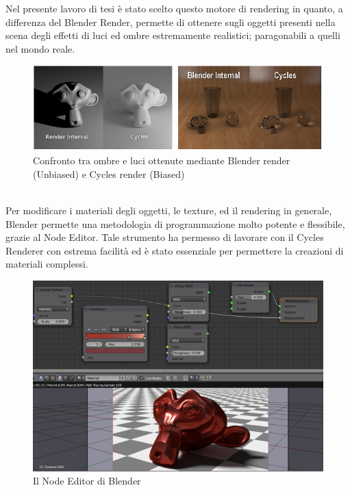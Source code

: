 Nel presente lavoro di tesi è stato scelto questo motore di rendering in quanto, a differenza del Blender Render, permette di ottenere sugli oggetti presenti nella scena degli effetti di luci ed ombre estremamente realistici; paragonabili a quelli nel mondo reale.
\begin{figure}[htb]
 \centering
 \includegraphics[width=0.9\linewidth]{images/chapter_tecnologie_abilitanti/tecnologie_abilitanti_bias_unbias.png}\hfill
 \caption[Cycles render e Blender render]{Confronto tra ombre e luci ottenute mediante Blender render (Unbiased) e Cycles render (Biased)}
 \label{fig:tecnologie_abilitanti_bias_unbias}
\end{figure}
\\
Per modificare i materiali degli oggetti, le texture, ed il rendering in generale, Blender permette una metodologia di programmazione molto potente e flessibile, grazie al Node Editor. Tale strumento ha permesso di lavorare con il Cycles Renderer con estrema facilità ed è stato essenziale per permettere la creazioni di materiali complessi. \cite{node_editor1,node_editor3}
\\
\begin{figure}[htb]
 \centering
 \includegraphics[width=1\linewidth]{images/chapter_tecnologie_abilitanti/tecnologie_abilitanti_node_editor.png}\hfill
 \caption[Blender Node Editor]{Il Node Editor di Blender}
 \label{fig:tecnologie_abilitanti_node_editor}
\end{figure}
